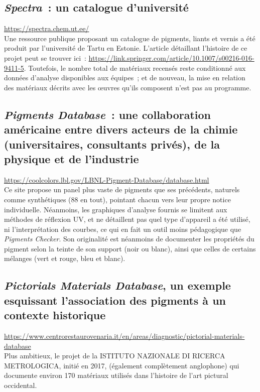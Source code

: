 \documentclass[a4paper,12pt, twoside]{book}
\begin{document}
 \subsection*{\textit{Spectra}~: un catalogue d’université}

 \url{https://spectra.chem.ut.ee/}\\

 Une ressource publique proposant un catalogue de pigments, liants et vernis a été produit par l’université de Tartu en Estonie. L’article détaillant l’histoire de ce projet peut se trouver ici~: \url{https://link.springer.com/article/10.1007/s00216-016-9411-5}. Toutefois, le nombre total de matériaux recensés reste conditionné aux données d’analyse disponibles aux équipes~; et de nouveau, la mise en relation des matériaux décrits avec les œuvres qu’ils composent n’est pas au programme.

 \subsection*{\textit{Pigments Database}~: une collaboration américaine entre divers acteurs de la chimie (universitaires, consultants privés), de la  physique et de l’industrie}

 \url{https://coolcolors.lbl.gov/LBNL-Pigment-Database/database.html}\\

 Ce site propose un panel plus vaste de pigments que ses précédents, naturels comme synthétiques (88 en tout), pointant chacun vers leur propre notice individuelle. Néanmoins, les graphiques d’analyse fournis se limitent aux méthodes de réflexion UV, et ne détaillent pas quel type d’appareil a été utilisé, ni l’interprétation des courbes, ce qui en fait un outil moins pédagogique que \textit{Pigments Checker}. Son originalité est néanmoins de documenter les propriétés du pigment selon la teinte de son support (noir ou blanc), ainsi que celles de certains mélanges (vert et rouge, bleu et blanc).

 \subsection*{\textit{Pictorials Materials Database}, un exemple esquissant l’association des pigments à un contexte historique}

 \url{https://www.centrorestaurovenaria.it/en/areas/diagnostic/pictorial-materials-database}\\

 Plus ambitieux, le projet de la ISTITUTO NAZIONALE DI RICERCA METROLOGICA, initié en 2017, (également complètement anglophone) qui documente environ 170 matériaux utilisés dans l’histoire de l’art pictural occidental.\\
\end{document}
